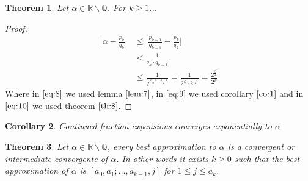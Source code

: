\documentclass[a4paper,11pt,american]{article}
\newcommand{\Q}{\mathbb{Q}}
\newcommand{\R}{\mathbb{R}}
\theoremstyle{plain}
\newtheorem{theorem}{Theorem}
\newtheorem{corollary}[theorem]{Corollary}
\theoremstyle{definition}
\begin{document}
\begin{theorem}
    Let $\alpha\in\R\backslash\Q$. For $k\geq 1$... 
\end{theorem}
\begin{proof}
    \begin{align}
        \vert\alpha-\frac{p_k}{q_k}\vert&\leq\vert \frac{p_{k-1}}{q_{k-1}}-\frac{p_k}{q_k}\vert \label{eq:8}\\
        &\leq \frac{1}{q_k\cdot q_{k-1}}\label{eq:9}\\
        &\leq \frac{1}{q^{\frac{k-1}{2}\cdot\frac{k-2}{2}}}=\frac{1}{2^k\cdot2^\frac{-3}{2}}=\frac{2^\frac{3}{2}}{2^k}\label{eq:10}
    \end{align}
    Where in $\eqref{eq:8}$ we used lemma $\eqref{lem:7}$, in \eqref{eq:9} we used corollary $\eqref{co:1}$ and in $\eqref{eq:10}$ we used theorem $\eqref{th:8}$.
\end{proof}
\begin{corollary}
    Continued fraction expansions converges exponentially to $\alpha$
\end{corollary}
\begin{theorem}
    Let $\alpha\in\R\backslash\Q$, every best approximation to $\alpha$ is a convergent or intermediate convergente of $\alpha$. In other words it exists $k\geq 0$ such that the best approximation of $\alpha$ is $[a_0,a_1;\dots,a_{k-1},j]$ for $1\leq j\leq a_k$.
\end{theorem}
\end{document}
